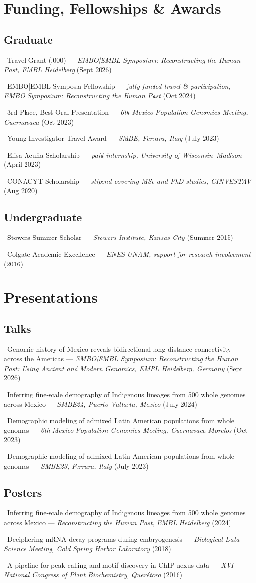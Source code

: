 \documentclass{tufte-handout}
\newcommand{\brow}[3]{%
  \noindent\textbullet\ #1 --- \textit{#2} (#3)\par
}
\begin{document}
\section*{Funding, Fellowships \& Awards}

\subsection*{Graduate}
\brow{Travel Grant (,000)}{EMBO|EMBL Symposium: Reconstructing the Human Past, EMBL Heidelberg}{Sept 2026}
\brow{EMBO|EMBL Symposia Fellowship}{fully funded travel \& participation, EMBO Symposium: Reconstructing the Human Past}{Oct 2024}
\brow{3rd Place, Best Oral Presentation}{6th Mexico Population Genomics Meeting, Cuernavaca}{Oct 2023}
\brow{Young Investigator Travel Award}{SMBE, Ferrara, Italy}{July 2023}
\brow{Elisa Acu\~na Scholarship}{paid internship, University of Wisconsin--Madison}{April 2023}
\brow{CONACYT Scholarship}{stipend covering MSc and PhD studies, CINVESTAV}{Aug 2020}

\subsection*{Undergraduate}
\brow{Stowers Summer Scholar}{Stowers Institute, Kansas City}{Summer 2015}
\brow{Colgate Academic Excellence}{ENES UNAM, support for research involvement}{2016}

\section*{Presentations}

\subsection*{Talks}
\brow{Genomic history of Mexico reveals bidirectional long-distance connectivity across the Americas}{EMBO|EMBL Symposium: Reconstructing the Human Past: Using Ancient and Modern Genomics, EMBL Heidelberg, Germany}{Sept 2026}
\brow{Inferring fine-scale demography of Indigenous lineages from 500 whole genomes across Mexico}{SMBE24, Puerto Vallarta, Mexico}{July 2024}
\brow{Demographic modeling of admixed Latin American populations from whole genomes}{6th Mexico Population Genomics Meeting, Cuernavaca-Morelos}{Oct 2023}
\brow{Demographic modeling of admixed Latin American populations from whole genomes}{SMBE23, Ferrara, Italy}{July 2023}

\subsection*{Posters}
\brow{Inferring fine-scale demography of Indigenous lineages from 500 whole genomes across Mexico}{Reconstructing the Human Past, EMBL Heidelberg}{2024}
\brow{Deciphering mRNA decay programs during embryogenesis}{Biological Data Science Meeting, Cold Spring Harbor Laboratory}{2018}
\brow{A pipeline for peak calling and motif discovery in ChIP-nexus data}{XVI National Congress of Plant Biochemistry, Quer\'etaro}{2016}
\end{document}

